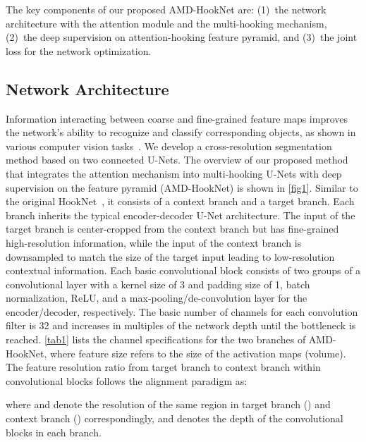 \documentclass[lettersize,journal,siunitx]{IEEEtran}
\begin{document}
The key components of our proposed AMD-HookNet are: (1)~the network architecture with the attention module and the multi-hooking mechanism, (2)~the deep supervision on attention-hooking feature pyramid, and (3)~the joint loss for the network optimization.

\subsection{Network Architecture}
Information interacting between coarse and fine-grained feature maps improves the network's ability to recognize and classify corresponding objects, as shown in various computer vision tasks~\cite{van2021hooknet,li2019siamrpn++,wosner2021object,zhao2015dirichlet}. 
We develop a cross-resolution segmentation method based on two connected U-Nets. The overview of our proposed method that integrates the attention mechanism into multi-hooking U-Nets with deep supervision on the feature pyramid (AMD-HookNet) is shown in \cref{fig1}. Similar to the original HookNet~\cite{van2021hooknet}, it consists of a context branch and a target branch. Each branch inherits the typical encoder-decoder U-Net architecture. The input of the target branch is center-cropped from the context branch but has fine-grained high-resolution information, while the input of the context branch is downsampled to match the size of the target input leading to low-resolution contextual information. Each basic convolutional block consists of two groups of a convolutional layer with a kernel size of 3 and padding size of 1, batch normalization, ReLU, and a max-pooling/de-convolution layer for the encoder/decoder, respectively. The basic number of channels for each convolution filter is 32 and increases in multiples of the network depth until the bottleneck is reached. \cref{tab1} lists the channel specifications for the two branches of AMD-HookNet, where feature size refers to the size of the activation maps (volume). The feature resolution ratio from target branch to context branch within convolutional blocks follows the alignment paradigm as:

where  and  denote the resolution of the same region in target branch () and context branch () correspondingly, and  denotes the depth of the convolutional blocks in each branch. 
\end{document}

